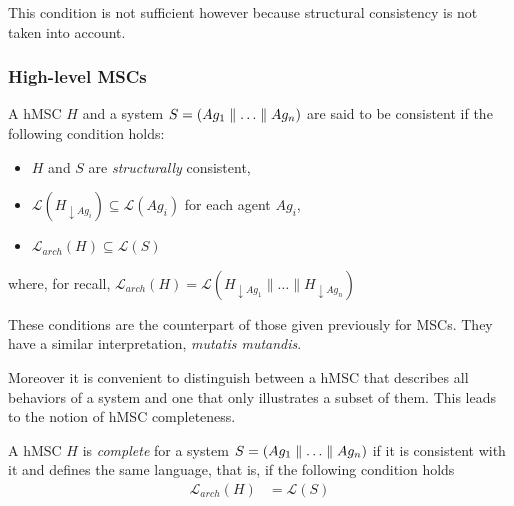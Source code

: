 This condition is not sufficient however because structural consistency is not taken into account.

\subsubsection*{High-level MSCs}

A hMSC $H$ and a system $S = (Ag_1 \parallel \ldots \parallel Ag_n)$ are said to be consistent if the following condition holds:

\begin{itemize}
\item $H$ and $S$ are \emph{structurally} consistent,
\item $\mathcal{L}(H_{\downarrow Ag_i}) \subseteq \mathcal{L}(Ag_i)$ for each agent $Ag_i$,
\item $\mathcal{L}_{arch}(H) \subseteq \mathcal{L}(S)$
\end{itemize}

\noindent where, for recall, $\mathcal{L}_{arch}(H) = \mathcal{L}(H_{\downarrow Ag_1} \parallel \ldots \parallel H_{\downarrow Ag_n})$

These conditions are the counterpart of those given previously for MSCs. They have a similar interpretation, \emph{mutatis mutandis}. 

Moreover it is convenient to distinguish between a hMSC that describes all behaviors of a system and one that only illustrates a subset of them. This leads to the notion of hMSC completeness. 

A hMSC $H$ is \emph{complete} for a system $S = (Ag_1 \parallel \ldots \parallel Ag_n)$ if it is consistent with it and defines the same language, that is, if the following condition holds
\begin{align}
\mathcal{L}_{arch}(H) &= \mathcal{L}(S)
\end{align}

